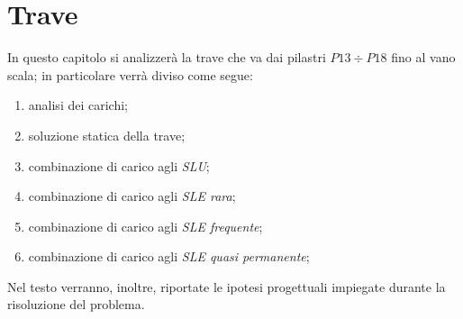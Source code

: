 \cleardoublepage
\chapter{Trave}\label{chap:beam}
In questo capitolo si analizzerà la trave che va dai pilastri $P13 \div P18$ fino al vano scala; in particolare verrà diviso come segue:
\begin{enumerate}
 \item analisi dei carichi;
 \item soluzione statica della trave;
 \item combinazione di carico agli \emph{SLU};
 \item combinazione di carico agli \emph{SLE rara};
 \item combinazione di carico agli \emph{SLE frequente};
 \item combinazione di carico agli \emph{SLE quasi permanente};
\end{enumerate}



Nel testo verranno, inoltre, riportate le ipotesi progettuali impiegate durante la risoluzione del problema.

